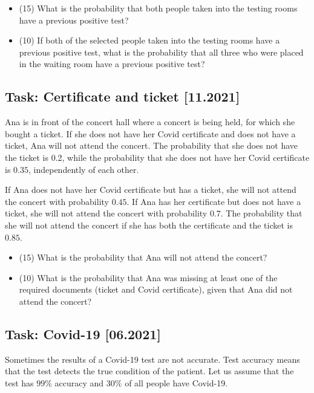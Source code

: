\documentclass[a4paper, 12pt]{article}
\begin{document}
\begin{itemize}
    \item [a)] (15) What is the probability that both people taken into the testing rooms have a previous positive test?
    \item [b)] (10) If both of the selected people taken into the testing rooms have a previous positive test, what is the probability that all three who were placed in the waiting room have a previous positive test?
\end{itemize}


\subsection*{Task: Certificate and ticket [11.2021]}


Ana is in front of the concert hall where a concert is being held, for which she bought a ticket. If she does not have her Covid certificate and does not have a ticket, Ana will not attend the concert. The probability that she does not have the ticket is 0.2, while the probability that she does not have her Covid certificate is $0.35$, independently of each other.

If Ana does not have her Covid certificate but has a ticket, she will not attend the concert with probability $0.45$. If Ana has her certificate but does not have a ticket, she will not attend the concert with probability $0.7$. The probability that she will not attend the concert if she has both the certificate and the ticket is $0.85$.

\begin{itemize}
    \item [a)] (15) What is the probability that Ana will not attend the concert?
    \item [b)] (10) What is the probability that Ana was missing at least one of the required documents (ticket and Covid certificate), given that Ana did not attend the concert?
\end{itemize}


\subsection*{Task: Covid-19 [06.2021]}

Sometimes the results of a Covid-19 test are not accurate. Test accuracy means that the test detects the true condition of the patient. Let us assume that the test has $99\%$ accuracy and $30\%$ of all people have Covid-19.
\end{document}
